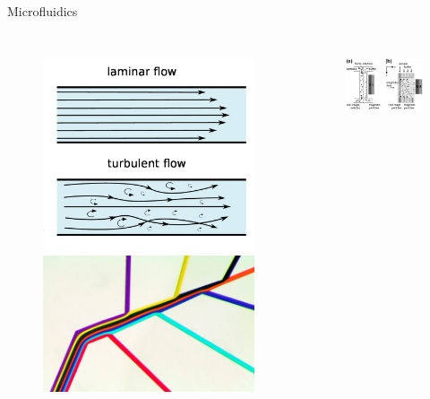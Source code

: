 \documentclass{beamer}
\begin{document}
\begin{frame}{Microfluidics}
\begin{columns}[c] %
\begin{figure}
\includegraphics[width=0.6\linewidth]{images/laminar-vs-turbulent-flow.png}\\
\includegraphics[width=0.6\linewidth]{images/laminar-flow.jpg}\\
\hspace*{11pt}\hbox{\scriptsize {}}

\end{figure}
\begin{figure}
\includegraphics[width=0.8\linewidth]{images/sorting-force.png}\\
\hspace*{11pt}\hbox{\scriptsize {}}


\end{figure}
\end{columns}
\end{frame}
\end{document}

